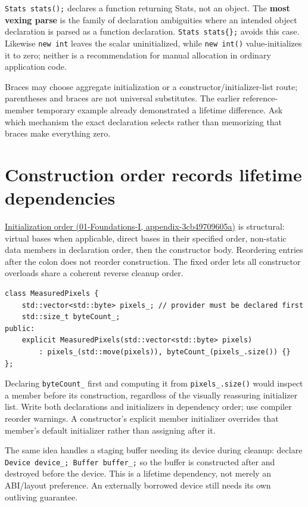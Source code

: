 \texttt{Stats\ stats();} declares a function returning Stats, not an object. The \textbf{most vexing parse} is the family of declaration ambiguities where an intended object declaration is parsed as a function declaration. \texttt{Stats\ stats\{\};} avoids this case. Likewise \texttt{new\ int} leaves the scalar uninitialized, while \texttt{new\ int()} value-initializes it to zero; neither is a recommendation for manual allocation in ordinary application code.

Braces may choose aggregate initialization or a constructor/initializer-list route; parentheses and braces are not universal substitutes. The earlier reference-member temporary example already demonstrated a lifetime difference. Ask which mechanism the exact declaration selects rather than memorizing that braces make everything zero.

\section{Construction order records lifetime dependencies}\label{05-engine-i-ch003-construction-order-records-lifetime-dependencies}

\href{../01-Foundations-I/main.pdf\#nameddest=appendix-3cb49709605a}{Initialization order (01-Foundations-I, appendix-3cb49709605a)} is structural: virtual bases when applicable, direct bases in their specified order, non-static data members in declaration order, then the constructor body. Reordering entries after the colon does not reorder construction. The fixed order lets all constructor overloads share a coherent reverse cleanup order.

\begin{verbatim}
class MeasuredPixels {
    std::vector<std::byte> pixels_; // provider must be declared first
    std::size_t byteCount_;
public:
    explicit MeasuredPixels(std::vector<std::byte> pixels)
        : pixels_(std::move(pixels)), byteCount_(pixels_.size()) {}
};
\end{verbatim}

Declaring \texttt{byteCount\_} first and computing it from \texttt{pixels\_.size()} would inspect a member before its construction, regardless of the visually reassuring initializer list. Write both declarations and initializers in dependency order; use compiler reorder warnings. A constructor's explicit member initializer overrides that member's default initializer rather than assigning after it.

The same idea handles a staging buffer needing its device during cleanup: declare \texttt{Device\ device\_;\ Buffer\ buffer\_;} so the buffer is constructed after and destroyed before the device. This is a lifetime dependency, not merely an ABI/layout preference. An externally borrowed device still needs its own outliving guarantee.

